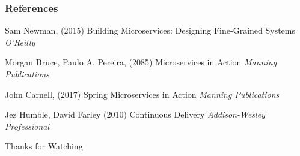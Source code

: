 \documentclass{beamer}
\begin{document}
	
\begin{frame}
\frametitle{References}
\footnotesize{
\begin{thebibliography}{99} %
 Sam Newman, (2015)
\newblock Building Microservices: Designing Fine-Grained Systems
\newblock \emph{O'Reilly}

 Morgan Bruce, Paulo A. Pereira, (2085)
\newblock Microservices in Action
\newblock \emph{Manning Publications}

 John Carnell, (2017)
\newblock Spring Microservices in Action
\newblock \emph{Manning Publications}

 Jez Humble, David Farley (2010)
\newblock Continuous Delivery
\newblock \emph{Addison-Wesley Professional}
\end{thebibliography}
}
\end{frame}


\begin{frame}
\Huge{\centerline{Thanks for Watching}}
\end{frame}

\end{document}
